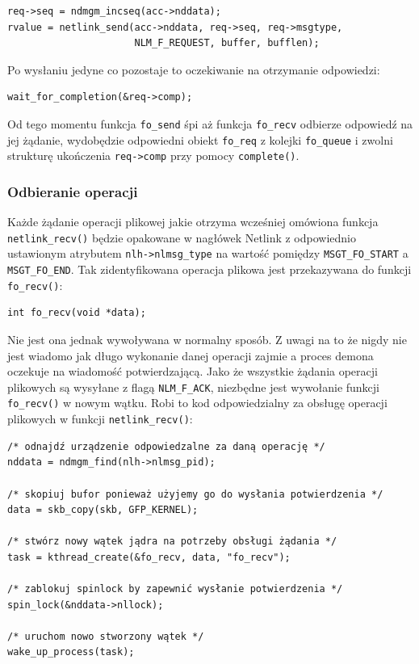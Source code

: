 \documentclass[11pt]{scrartcl}
\begin{document}
\begin{verbatim}
req->seq = ndmgm_incseq(acc->nddata);
rvalue = netlink_send(acc->nddata, req->seq, req->msgtype,
                      NLM_F_REQUEST, buffer, bufflen);
\end{verbatim}

Po wysłaniu jedyne co pozostaje to oczekiwanie na otrzymanie odpowiedzi:

\begin{verbatim}
wait_for_completion(&req->comp);
\end{verbatim}

Od tego momentu funkcja \texttt{fo\_send} śpi aż funkcja \texttt{fo\_recv} odbierze odpowiedź na jej żądanie, wydobędzie odpowiedni obiekt \texttt{fo\_req} z kolejki \texttt{fo\_queue} i zwolni strukturę ukończenia \texttt{req-\textgreater{}comp} przy pomocy \texttt{complete()}.

\subsubsection{Odbieranie operacji}
\label{forecv}

Każde żądanie operacji plikowej jakie otrzyma wcześniej omówiona funkcja \texttt{netlink\_recv()} będzie opakowane w nagłówek Netlink z odpowiednio ustawionym atrybutem \newline\texttt{nlh-\textgreater{}nlmsg\_type} na wartość pomiędzy \texttt{MSGT\_FO\_START} a \texttt{MSGT\_FO\_END}.  Tak zidentyfikowana operacja plikowa jest przekazywana do funkcji \texttt{fo\_recv()}:

\begin{verbatim}
int fo_recv(void *data);
\end{verbatim}

Nie jest ona jednak wywoływana w normalny sposób. Z uwagi na to że nigdy nie jest wiadomo jak długo wykonanie danej operacji zajmie a proces demona oczekuje na wiadomość potwierdzającą. Jako że wszystkie żądania operacji plikowych są wysyłane z flagą \texttt{NLM\_F\_ACK}, niezbędne jest wywołanie funkcji \texttt{fo\_recv()} w nowym wątku. Robi to kod odpowiedzialny za obsługę operacji plikowych w funkcji \texttt{netlink\_recv()}:

\begin{verbatim}
/* odnajdź urządzenie odpowiedzalne za daną operację */
nddata = ndmgm_find(nlh->nlmsg_pid);

/* skopiuj bufor ponieważ użyjemy go do wysłania potwierdzenia */
data = skb_copy(skb, GFP_KERNEL);

/* stwórz nowy wątek jądra na potrzeby obsługi żądania */
task = kthread_create(&fo_recv, data, "fo_recv");

/* zablokuj spinlock by zapewnić wysłanie potwierdzenia */
spin_lock(&nddata->nllock);

/* uruchom nowo stworzony wątek */
wake_up_process(task);
\end{verbatim}
\end{document}
